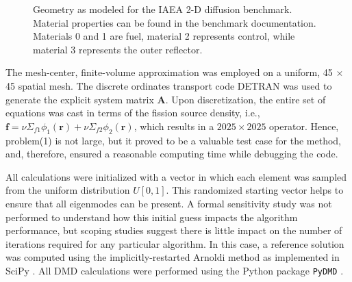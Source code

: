 \begin{figure}[htb!]
\caption{Geometry as modeled for the IAEA 2-D diffusion benchmark.  Material properties can be found in the benchmark documentation.  Materials 0 and 1 are fuel, material 2 represents control, while material 3 represents the outer reflector.}
\label{fig:iaea2d}
\end{figure}

The mesh-center, finite-volume approximation was employed on a uniform, 45 $\times$ 45 spatial mesh.
The discrete ordinates transport code DETRAN was used to generate the explicit system matrix $\mathbf{A}$.
Upon discretization, the entire set of equations was cast in terms of the fission source density, i.e., $\mathbf{f} = \nu\Sigma_{f1}\phi_1(\mathbf{r}) + \nu\Sigma_{f2}\phi_2(\mathbf{r})$, which results in a $2025 \times 2025$ operator. 
Hence, problem(1) is not large, but it proved to be a valuable test case for the method, and, therefore, ensured a reasonable computing time while debugging the code.


All calculations were initialized with a vector in which each element was sampled from the uniform distribution $U[0, 1]$. 
This randomized starting vector helps to ensure that all eigenmodes can be present.
A formal sensitivity study was not performed to understand how this initial guess impacts the algorithm performance, but scoping studies suggest there is little impact on the number of iterations required for any particular algorithm.
In this case, a reference solution was computed using the implicitly-restarted Arnoldi method as implemented in SciPy \cite{scipy}.
All DMD calculations were performed using the Python package {\tt PyDMD} \cite{pydmd}.

